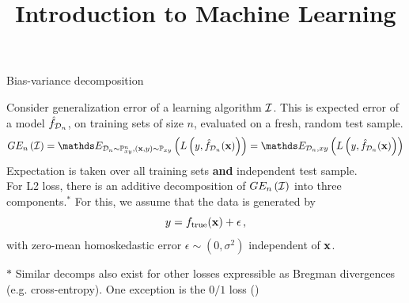 \documentclass[11pt,compress,t,notes=noshow, xcolor=table]{beamer}
\title{Introduction to Machine Learning}
\begin{document}
    

\begin{vbframe} {Bias-variance decomposition}

Consider generalization error of a learning algorithm $\mathcal{I}$.
This is expected error of a model $\hat{f}_{\mathcal{D}_n}$, on training sets of size $n$, evaluated on a fresh, random test sample.
  $$GE_n\left(\ind\right) = \E_{\D_n \sim \Pxy^n, (\xv, y) \sim \Pxy}\left( L\left(y, \fh_{\D_n}(\xv)\right) \right) = \E_{\D_n, xy}\left( L\left(y, \fh_{\D_n}(\xv)\right) \right)  $$
Expectation is taken over all training sets \textbf{and} independent test sample.\\
\lz
For L2 loss, there is an additive decomposition of $GE_n\left(\mathcal{I}\right)$ into three components.$^{\ast}$ For this, we assume that the data is generated by 
$$
y = f_{\text{true}}(\mathbf{x}) + \epsilon\,,
$$
with zero-mean homoskedastic error $\epsilon \sim (0, \sigma^2)$ independent of $\mathbf{x}$.
\vspace{0.1cm}

{\scriptsize ${\ast}$ Similar decomps also exist for other losses expressible as Bregman divergences (e.g. cross-entropy). One exception is the $0/1$ loss (\cite{BROWN2024BIAS})}

\framebreak 



\end{vbframe}
\end{document}

